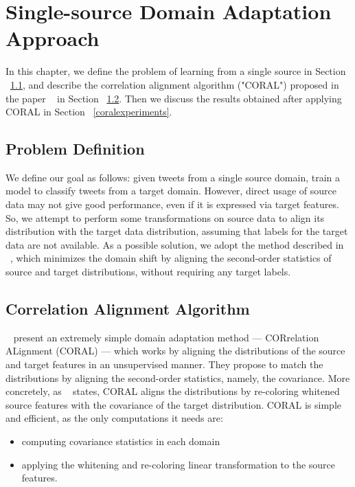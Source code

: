 \cleardoublepage

\chapter{Single-source Domain Adaptation Approach}
\label{coralchapter}

In this chapter, we define the problem of learning from a single source in Section ~\ref{coralproblemdefinitions}, and describe the correlation alignment algorithm ("CORAL") proposed in the paper ~\citep{coral} in Section ~\ref{coralalg}. Then we discuss the results obtained after applying CORAL in Section ~\ref{coralexperiments}.

\section{Problem Definition}
\label{coralproblemdefinitions}

We define our goal as follows: given tweets from a single source domain, train a model to classify tweets from a target domain. However, direct usage of source data may not give good performance, even if it is expressed via target features. So, we attempt to perform some transformations on source data to align its distribution with the target data distribution, assuming that labels for the target data are not available. As a possible solution, we adopt the method described in ~\citep{coral}, which minimizes the domain shift by aligning the second-order statistics of source and target distributions, without requiring any target labels. 



\section{Correlation Alignment Algorithm}
\label{coralalg}

~\citep{coral} present an extremely simple domain adaptation method --- CORrelation ALignment (CORAL) --- which works by aligning the distributions of the source and target features in an unsupervised manner. They propose to match the distributions by aligning the second-order statistics, namely, the covariance. More concretely, as ~\citep{coral} states, CORAL aligns the distributions by re-coloring whitened source features with the covariance of the target distribution. CORAL is simple and efficient, as the only computations it needs are:
\begin{itemize}
  \item computing covariance statistics in each domain
  \item applying the whitening and re-coloring linear transformation to the source features.
\end{itemize}

